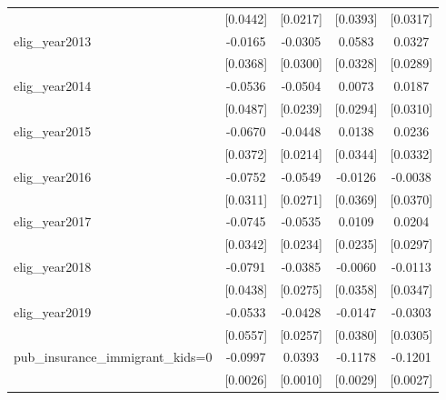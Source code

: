 \begin{table}[htbp]
\begin{tabular}{l*{4}{c}}
                    &    [0.0442]         &    [0.0217]         &    [0.0393]         &    [0.0317]         \\
\addlinespace
elig\_year2013       &     -0.0165         &     -0.0305         &      0.0583\sym{*}  &      0.0327         \\
                    &    [0.0368]         &    [0.0300]         &    [0.0328]         &    [0.0289]         \\
\addlinespace
elig\_year2014       &     -0.0536         &     -0.0504\sym{**} &      0.0073         &      0.0187         \\
                    &    [0.0487]         &    [0.0239]         &    [0.0294]         &    [0.0310]         \\
\addlinespace
elig\_year2015       &     -0.0670\sym{*}  &     -0.0448\sym{**} &      0.0138         &      0.0236         \\
                    &    [0.0372]         &    [0.0214]         &    [0.0344]         &    [0.0332]         \\
\addlinespace
elig\_year2016       &     -0.0752\sym{**} &     -0.0549\sym{**} &     -0.0126         &     -0.0038         \\
                    &    [0.0311]         &    [0.0271]         &    [0.0369]         &    [0.0370]         \\
\addlinespace
elig\_year2017       &     -0.0745\sym{**} &     -0.0535\sym{**} &      0.0109         &      0.0204         \\
                    &    [0.0342]         &    [0.0234]         &    [0.0235]         &    [0.0297]         \\
\addlinespace
elig\_year2018       &     -0.0791\sym{*}  &     -0.0385         &     -0.0060         &     -0.0113         \\
                    &    [0.0438]         &    [0.0275]         &    [0.0358]         &    [0.0347]         \\
\addlinespace
elig\_year2019       &     -0.0533         &     -0.0428         &     -0.0147         &     -0.0303         \\
                    &    [0.0557]         &    [0.0257]         &    [0.0380]         &    [0.0305]         \\
\addlinespace
pub\_insurance\_immigrant\_kids=0&     -0.0997\sym{***}&      0.0393\sym{***}&     -0.1178\sym{***}&     -0.1201\sym{***}\\
                    &    [0.0026]         &    [0.0010]         &    [0.0029]         &    [0.0027]         \\

\end{tabular}
\end{table}
